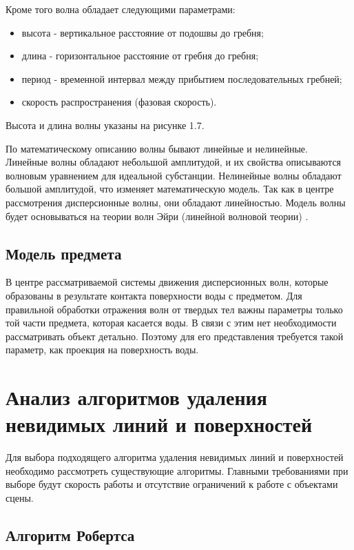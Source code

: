 Кроме того волна обладает следующими параметрами:

\begin{itemize}
	\item высота - вертикальное расстояние от подошвы до гребня;
	\item длина - горизонтальное расстояние от гребня до гребня;
	\item период - временной интервал между прибытием последовательных гребней;
	\item скорость распространения (фазовая скорость).
\end{itemize}

Высота и длина волны указаны на рисунке 1.7.

По математическому описанию волны бывают линейные и нелинейные. Линейные волны обладают небольшой амплитудой, и их свойства описываются волновым уравнением для идеальной субстанции. Нелинейные волны обладают большой амплитудой, что изменяет математическую модель. Так как в центре рассмотрения дисперсионные волны, они обладают линейностью. Модель волны будет основываться на теории волн Эйри (линейной волновой теории) \cite{airy}.

\subsection{Модель предмета}

В центре рассматриваемой системы движения дисперсионных волн, которые образованы в результате контакта поверхности воды с предметом. Для правильной обработки отражения волн от твердых тел важны параметры только той части предмета, которая касается воды.  В связи с этим нет необходимости рассматривать объект детально. Поэтому для его представления требуется такой параметр, как проекция на поверхность воды.

\section{Анализ алгоритмов удаления невидимых линий и поверхностей}

Для выбора подходящего алгоритма удаления невидимых линий и поверхностей необходимо рассмотреть существующие алгоритмы. Главными требованиями при выборе будут скорость работы и отсутствие ограничений к работе с объектами сцены.

\subsection{Алгоритм Робертса}

